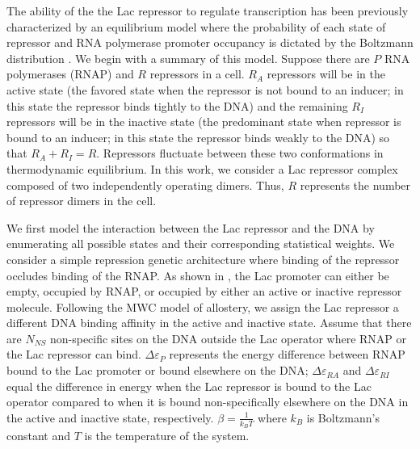 The ability of the the Lac repressor to regulate transcription has been
previously characterized by an equilibrium model where the probability of each
state of repressor and RNA polymerase promoter occupancy is dictated by the
Boltzmann distribution \cite{Daber2011a, Phillips2015a}. We begin with a
summary of this model. Suppose there are \(P\) RNA polymerases (RNAP) and \(R\)
repressors in a cell. \(R_A\) repressors will be in the active state (the
favored state when the repressor is not bound to an inducer; in this state the
repressor binds tightly to the DNA) and the remaining \(R_I\) repressors will
be in the inactive state (the predominant state when repressor is bound to an
inducer; in this state the repressor binds weakly to the DNA) so that
\(R_A+R_I=R\). Repressors fluctuate between these two conformations in thermodynamic equilibrium\cite{Kern2003}. In this work, we consider a Lac repressor complex composed of two independently operating dimers. Thus, $R$ represents the number of repressor dimers in the cell.

We first model the interaction between the Lac repressor and the DNA by
enumerating all possible states and their corresponding statistical weights. We
consider a simple repression genetic architecture where binding of the
repressor occludes binding of the RNAP. As shown in
\fref[figpolymeraseRepressorStates], the Lac promoter can either be empty,
occupied by RNAP, or occupied by either an active or inactive repressor
molecule. Following the MWC model of allostery, we assign the Lac repressor a
different DNA binding affinity in the active and inactive state. Assume that
there are $N_{NS}$ non-specific sites on the DNA outside the Lac operator where
RNAP or the Lac repressor can bind. \(\Delta\varepsilon_{P}\) represents the
energy difference between RNAP bound to the Lac promoter or bound elsewhere on
the DNA; \(\Delta\varepsilon_{RA}\) and \(\Delta\varepsilon_{RI}\) equal the
difference in energy when the Lac repressor is bound to the Lac operator
compared to when it is bound non-specifically elsewhere on the DNA in the
active and inactive state, respectively. $\beta = \frac{1}{k_BT}$ where $k_B$
is Boltzmann's constant and $T$ is the temperature of the system.

